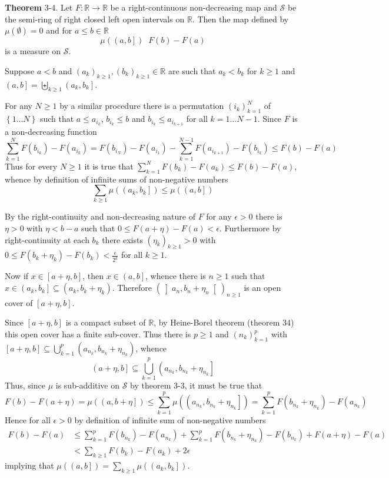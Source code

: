 \documentclass[a4paper]{article}
\newcommand{\obj}[1]{\left\{ #1 \right \}}
\newcommand{\clo}[1]{\left [ #1 \right ]}
\newcommand{\ploc}[1]{\left ( #1 \right ]}
\newcommand{\brac}[1]{\left ( #1 \right )}
\newcommand{\crab}[1]{\left ] #1 \right [}
\newcommand{\Real}{\mathbb{R}}
\newcommand{\Scal}{\mathcal{S}}
\newcommand{\defn}{\mathop{\overset{\Delta}{=}}\nolimits}
\begin{document}
\label{thm:stieltjes_meas_const2} \noindent \textbf{Theorem} 3-4.
Let $F:\Real\to\Real$ be a right-continuous non-decreasing map and $\Scal$ be the semi-ring of right closed left open intervals on $\Real$. Then the map defined by $\mu\brac{\emptyset}=0$ and for $a\leq b\in \Real$ \[\mu\brac{\ploc{a,b}}\defn F\brac{b}-F\brac{a}\] is a measure on $\Scal$.

Suppose $a<b$ and $\brac{a_k}_{k\geq1}, \brac{b_k}_{k\geq1}\in \Real$ are such that $a_k<b_k$ for $k\geq1$ and $\ploc{a,b}=\biguplus_{k\geq1} \ploc{a_k,b_k}$.

For any $N\geq1$ by a similar procedure there is a permutation $\brac{i_k}_{k=1}^N$ of $\obj{1\ldots N}$ such that $a\leq a_{i_k}$, $b_{i_k}\leq b$ and $b_{i_k}\leq a_{i_{k+1}}$ for all $k=1\ldots{N-1}$. Since $F$ is a non-decreasing function\[\sum_{k=1}^N F\brac{b_{i_k}} - F\brac{a_{i_k}} = F\brac{b_{i_N}} - F\brac{a_{i_1}} - \sum_{k=1}^{N-1} F\brac{a_{i_{k+1}}}-F\brac{b_{i_k}} \leq F\brac{b} - F\brac{a}\] Thus for every $N\geq1$ it is true that $\sum_{k=1}^N F\brac{b_k} - F\brac{a_k}\leq F\brac{b} - F\brac{a}$, whence by definition of infinite sums of non-negative numbers \[\sum_{k\geq1} \mu\brac{\ploc{a_k,b_k}}\leq \mu\brac{\ploc{a,b}}\]

By the right-continuity and non-decreasing nature of $F$ for any $\epsilon>0$ there is $\eta>0$ with $\eta<b-a$ such that $0\leq F\brac{a+\eta}-F\brac{a}<\epsilon$. Furthermore by right-continuity at each $b_k$ there exists $\brac{\eta_k}_{k\geq1}>0$ with $0\leq F\brac{b_k+\eta_k}-F\brac{b_k}<\frac{\epsilon}{2^k}$ for all $k\geq 1$.

Now if $x\in \clo{a+\eta,b}$, then $x\in\ploc{a,b}$, whence there is $n\geq1$ such that $x\in \ploc{a_k,b_k}\subseteq \brac{a_k,b_k+\eta_k}$. Therefore $\brac{\crab{a_n, b_n+\eta_n}}_{n\geq 1}$ is an open cover of $\clo{a+\eta, b}$.

Since $\clo{a+\eta,b}$ is a compact subset of $\Real$, by Heine-Borel theorem (theorem 34) this open cover has a finite sub-cover. Thus there is $p\geq 1$ and $\brac{n_k}_{k=1}^p$ with $\clo{a+\eta,b}\subseteq \bigcup_{k=1}^p \brac{a_{n_k}, b_{n_k}+\eta_{n_k}}$, whence \[\ploc{a+\eta,b} \subseteq \bigcup_{k=1}^p \ploc{a_{n_k},b_{n_k}+\eta_{n_k}}\] Thus, since $\mu$ is sub-additive on $\Scal$ by theorem 3-3, it must be true that \[F\brac{b}-F\brac{a+\eta} = \mu\brac{\ploc{a,b+\eta}}\leq \sum_{k=1}^p \mu\brac{\ploc{a_{n_k},b_{n_k}+\eta_{n_k}}} = \sum_{k=1}^p F\brac{b_{n_k}+\eta_{n_k}}-F\brac{a_{n_k}}\] Hence for all $\epsilon>0$ by definition of infinite sum of non-negative numbers \begin{align*}F\brac{b}-F\brac{a} &\leq \sum_{k=1}^p F\brac{b_{n_k}}-F\brac{a_{n_k}} + \sum_{k=1}^p F\brac{b_{n_k}+\eta_{n_k}}-F\brac{b_{n_k}} + F\brac{a+\eta}-F\brac{a} \\&< \sum_{k\geq1} F\brac{b_k}-F\brac{a_k} + 2\epsilon\end{align*} implying that $\mu\brac{\ploc{a,b}} = \sum_{k\geq1} \mu\brac{\ploc{a_k,b_k}}$.
\end{document}
